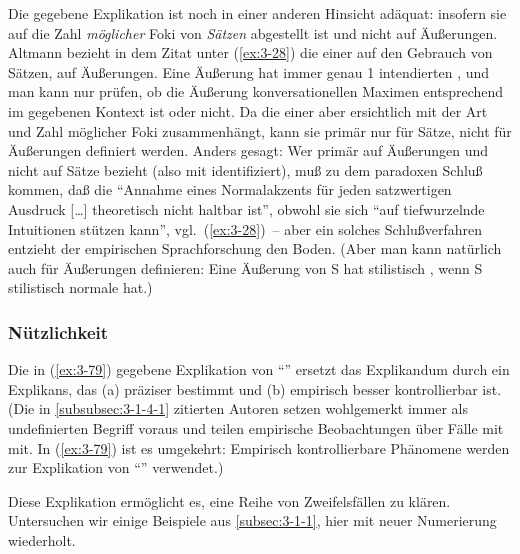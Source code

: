 \documentclass[output=paper]{langsci/langscibook}
\begin{document}
Die gegebene Explikation ist noch in einer anderen Hinsicht adäquat:
insofern sie auf die Zahl \textit{möglicher} Foki von \textit{Sätzen}
abgestellt ist und nicht auf Äußerungen. Altmann bezieht in dem Zitat
unter (\ref{ex:3-28}) die  einer  auf den Gebrauch von
Sätzen, \dash auf Äußerungen. Eine Äußerung hat immer genau 1
intendierten , und man kann nur prüfen, ob die Äußerung
konversationellen Maximen entsprechend im gegebenen Kontext
 ist oder nicht. Da die  einer
 aber ersichtlich mit der Art und Zahl möglicher Foki
zusammenhängt, kann sie primär nur für Sätze, nicht für Äußerungen
definiert werden. Anders gesagt: Wer  primär
auf Äußerungen und nicht auf Sätze bezieht (also mit
 identifiziert), muß zu dem paradoxen
Schluß kommen, daß die "`Annahme eines Normalakzents für jeden
satzwertigen Ausdruck [\ldots] theoretisch nicht haltbar ist"', obwohl
sie sich "`auf tiefwurzelnde Intuitionen stützen kann"', vgl.\ (\ref{ex:3-28})~--
aber ein solches Schlußverfahren entzieht der empirischen
Sprachforschung den Boden. (Aber man kann 
natürlich auch für Äußerungen definieren: Eine Äußerung von S hat
stilistisch , wenn S stilistisch normale
 hat.)

\subsubsection{Nützlichkeit}
\label{subsubsec:3-1-4-2}

Die in (\ref{ex:3-79}) gegebene Explikation von "`"' ersetzt das
Explikandum durch ein Explikans, das (a) präziser bestimmt und (b)
empirisch besser kontrollierbar ist. (Die in \ref{subsubsec:3-1-4-1} zitierten Autoren
setzen wohlgemerkt  immer als undefinierten
Begriff voraus und teilen empirische Beobachtungen über Fälle mit
 mit. In (\ref{ex:3-79}) ist es umgekehrt: Empirisch
kontrollierbare Phänomene werden zur Explikation von "`"'
verwendet.)

Diese Explikation ermöglicht es, eine Reihe von Zweifelsfällen zu
klären. Untersuchen wir einige Beispiele aus \ref{subsec:3-1-1}, hier mit neuer
Numerierung wiederholt.
\end{document}
